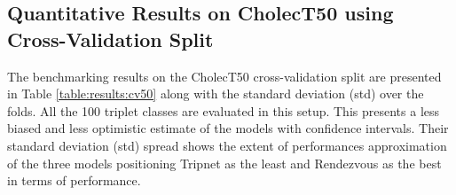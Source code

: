 \documentclass{article}
\begin{document}
{ 










\subsection{Quantitative Results on CholecT50 using Cross-Validation Split}
The benchmarking results on the CholecT50 cross-validation split are presented in Table \ref{table:results:cv50} along with the standard deviation (std) over the folds.
All the 100 triplet classes are evaluated in this setup.
This presents a less biased and less optimistic estimate of the models with confidence intervals.
Their standard deviation (std) spread shows the extent of performances approximation of the three models positioning  Tripnet as the least and Rendezvous as the best in terms of performance.

\begin{table}[ht]
\centering
    \setlength{\tabcolsep}{9pt}
    \captionsetup{skip=0pt,singlelinecheck=off,justification=raggedright}
    \caption{Benchmark triplet recognition AP (\%) on CholecT50 dataset using the official cross-validation split.}
    \label{table:results:cv50}
\end{table} 








}
\end{document}
